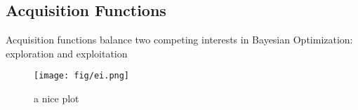 \subsection{Acquisition Functions}
Acquisition functions balance two competing interests in Bayesian Optimization: exploration and exploitation

\begin{definition}[vEI]
\end{definition}

\begin{figure}[h]
    \centering
    \texttt{[image: fig/ei.png]}
    \caption{a nice plot}
    \label{fig:ei}
\end{figure}
